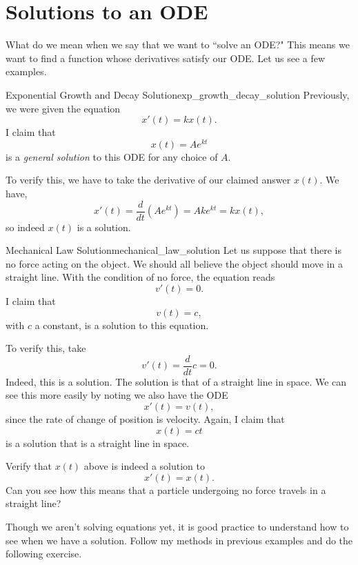         \section{Solutions to an ODE}

        What do we mean when we say that we want to ``solve an ODE?" This means we want to find a function whose derivatives satisfy our ODE.  Let us see a few examples.

        \begin{ex}{Exponential Growth and Decay Solution}{exp_growth_decay_solution}
        Previously, we were given the equation
        \[
        x'(t)=kx(t).
        \]
        I claim that
        \[
        x(t)=Ae^{kt}
        \]
        is a \emph{general solution} to this ODE for any choice of $A$.

        To verify this, we have to take the derivative of our claimed answer $x(t)$. We have,
        \[
        x'(t)=\frac{d}{dt}\left(Ae^{kt}\right)=Ake^{kt}=kx(t),
        \]
        so indeed $x(t)$ is a solution.
        \end{ex}

        \begin{ex}{Mechanical Law Solution}{mechanical_law_solution}
        Let us suppose that there is no force acting on the object.  We should all believe the object should move in a straight line.  With the condition of no force, the equation reads
        \[
        v'(t)=0.
        \]
        I claim that
        \[
        v(t)=c,
        \]
        with $c$ a constant, is a solution to this equation.

        To verify this, take
        \[
        v'(t)=\frac{d}{dt} c = 0.
        \]
        Indeed, this is a solution.  The solution is that of a straight line in space.  We can see this more easily by noting we also have the ODE
        \[
        x'(t) = v(t),
        \]
        since the rate of change of position is velocity. Again, I claim that
        \[
        x(t) = ct
        \]
        is a solution that is a straight line in space.
        \end{ex}

        \begin{exercise}
        Verify that $x(t)$ above is indeed a solution to
        \[
        x'(t)=x(t).
        \]
        Can you see how this means that a particle undergoing no force travels in a straight line?
        \end{exercise}


        \noindent Though we aren't solving equations yet, it is good practice to understand how to see when we have a solution.  Follow my methods in previous examples and do the following exercise.

